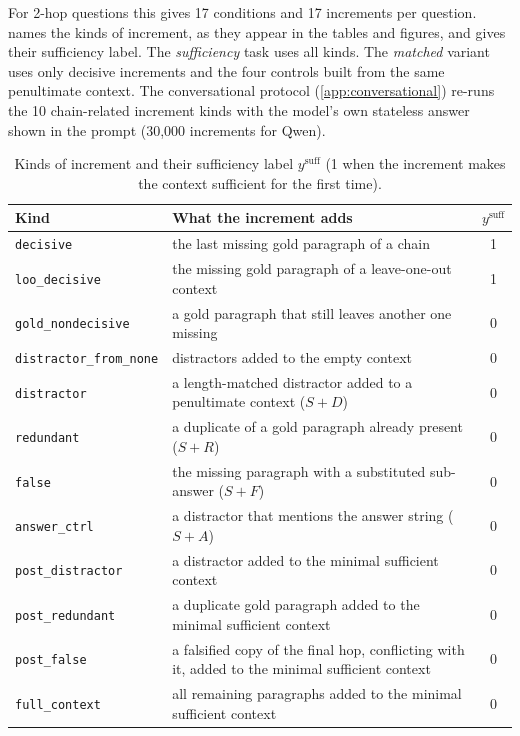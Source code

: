For 2-hop questions this gives 17 conditions and 17 increments per question.  names the kinds of increment, as they appear in the tables and figures, and gives their sufficiency label. The \emph{sufficiency} task uses all kinds. The \emph{matched} variant uses only decisive increments and the four controls built from the same penultimate context. The conversational protocol (\cref{app:conversational}) re-runs the 10 chain-related increment kinds with the model's own stateless answer shown in the prompt (30{,}000 increments for Qwen).

\begin{table}[h]
\centering\small
\begin{tabular}{lp{9cm}c}
\toprule
Kind & What the increment adds & $y^{\mathrm{suff}}$ \\
\midrule
\texttt{decisive} & the last missing gold paragraph of a chain & 1 \\
\texttt{loo\_decisive} & the missing gold paragraph of a leave-one-out context & 1 \\
\texttt{gold\_nondecisive} & a gold paragraph that still leaves another one missing & 0 \\
\texttt{distractor\_from\_none} & distractors added to the empty context & 0 \\
\texttt{distractor} & a length-matched distractor added to a penultimate context ($S{+}D$) & 0 \\
\texttt{redundant} & a duplicate of a gold paragraph already present ($S{+}R$) & 0 \\
\texttt{false} & the missing paragraph with a substituted sub-answer ($S{+}F$) & 0 \\
\texttt{answer\_ctrl} & a distractor that mentions the answer string ($S{+}A$) & 0 \\
\texttt{post\_distractor} & a distractor added to the minimal sufficient context & 0 \\
\texttt{post\_redundant} & a duplicate gold paragraph added to the minimal sufficient context & 0 \\
\texttt{post\_false} & a falsified copy of the final hop, conflicting with it, added to the minimal sufficient context & 0 \\
\texttt{full\_context} & all remaining paragraphs added to the minimal sufficient context & 0 \\
\bottomrule
\end{tabular}
\caption{Kinds of increment and their sufficiency label $y^{\mathrm{suff}}$ (1 when the increment makes the context sufficient for the first time).}
\label{tab:kinds}
\end{table}
